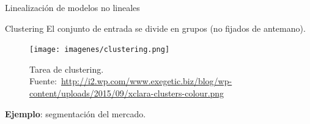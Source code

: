 \documentclass[hyperref={unicode}]{beamer}
\begin{document}
\begin{frame}{Linealización de modelos no lineales}
	\begin{table}[htbp!]
		\centering
		\caption{Linealización de distintos modelos}
		\label{tbl:linealizacion}
	\end{table} 
\end{frame}


\begin{frame}{Clustering}
	El conjunto de entrada se divide en grupos (no fijados de antemano).
	
	\begin{figure}
			\begin{center}
			\texttt{[image: imagenes/clustering.png]}
			\caption{Tarea de clustering. Fuente:~\url{http://i2.wp.com/www.exegetic.biz/blog/wp-content/uploads/2015/09/xclara-clusters-colour.png}}
			\end{center}
	\end{figure}
			
	\textbf{Ejemplo}: segmentación del mercado. 
\end{frame}
\end{document}

